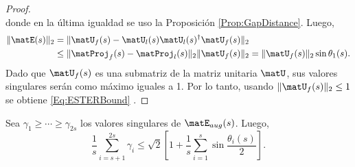 \begin{proof}
\[	\]
	donde en la última igualdad se uso la Proposición \ref{Prop:GapDistance}. Luego,
	\begin{equation}
		\begin{aligned} \|\matE(s)\|_2 & = \|\matU_{f}(s) -\matU_{l}(s)\matU_l(s)^\dagger\matU_f(s)\|_2 \\
			&\le \|\matProj_f(s) - \matProj_l(s)\|_2\|\matU_f(s)\|_2 = \|\matU_f(s)\|_2\sin \theta_1(s). \end{aligned}
		\label{Eq:ESTER_gap_Theo}
	\end{equation}
	Dado que $\matU_f(s)$ es una submatriz de la matriz unitaria $\matU$, sus valores singulares serán como máximo iguales a 1. Por lo tanto,  usando $\|\matU_f(s)\|_2\leq 1$ se obtiene \eqref{Eq:ESTERBound} . \end{proof}


\begin{theorem}\label{The1:SAMOS}
	Sea $\gamma_1\ge\cdots\ge\gamma_{2s}$ los valores singulares de $\matE_{aug}(s)$. Luego,
	\begin{equation}
		\frac{1}{s}\sum_{i=s+1}^{2s}\gamma_i\le \sqrt{2}\left[1+\frac{1}{s}\sum_{i=1}^s\sin\frac{\theta_{i}(s)}{2}\right].
		\label{eq:Angle_Weyl}
	\end{equation}
\end{theorem}
